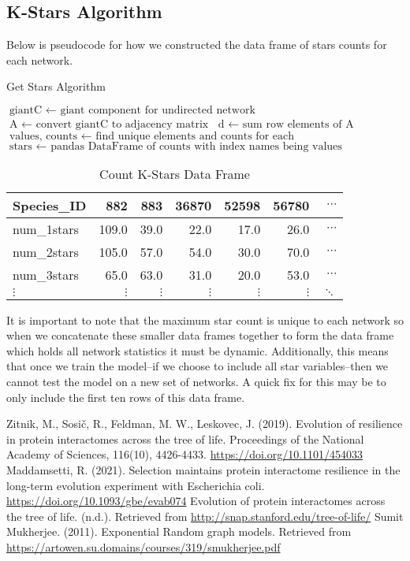 \documentclass[12pt]{article}
\begin{document}
\subsection{K-Stars Algorithm}
Below is pseudocode for how we constructed the data frame of stars counts for each network.
\begin{algorithm}
\caption{Get Stars Algorithm}\label{alg:cap}
\begin{algorithmic}
\State $\text{giantC } \gets \text{ giant component for undirected network}$
\State $\text{A } \gets \text{ convert giantC to adjacency matrix}$
\State $\text{d } \gets \text{ sum row elements of A}$
\State $\text{values, counts } \gets \text{ find unique elements and counts for each}$
\State $\text{stars } \gets \text{ pandas DataFrame of counts with index names being values}$
\end{algorithmic}
\end{algorithm}
\begin{table}[H]
\centering
\caption{Count K-Stars Data Frame}
\begin{tabular}{lrrrrrr}
\toprule
Species\_ID &  882   &  883   &  36870 &  52598 &  56780 & $\cdots$\\
\midrule
num\_1stars &  109.0 &   39.0 &   22.0 &   17.0 &   26.0 & $\cdots$\\
num\_2stars &  105.0 &   57.0 &   54.0 &   30.0 &   70.0 & $\cdots$\\
num\_3stars &   65.0 &   63.0 &   31.0 &   20.0 &   53.0 & $\cdots$\\
$\vdots$ &   $\vdots$ &   $\vdots$ &   $\vdots$ &    $\vdots$ &   $\vdots$ & $\ddots$\\
\bottomrule
\end{tabular}
\end{table}
It is important to note that the maximum star count is unique to each network so when we concatenate these smaller data frames together to form the data frame which holds all network statistics it must be dynamic. Additionally, this means that once we train the model--if we choose to include all star variables--then we cannot test the model on a new set of networks. A quick fix for this may be to only include the first ten rows of this data frame. \newpage
\begin{thebibliography}{1}
  Zitnik, M., Sosič, R., Feldman, M. W., Leskovec, J. (2019). Evolution of resilience in protein interactomes across the tree of life. Proceedings of the National Academy of Sciences, 116(10), 4426-4433. \url{https://doi.org/10.1101/454033}
 Maddamsetti, R. (2021). Selection maintains protein interactome resilience in the long-term evolution experiment with Escherichia coli. \url{https://doi.org/10.1093/gbe/evab074}
 Evolution of protein interactomes across the tree of life. (n.d.). Retrieved from \url{http://snap.stanford.edu/tree-of-life/}
 Sumit Mukherjee. (2011). Exponential Random graph models. Retrieved from \url{https://artowen.su.domains/courses/319/smukherjee.pdf}
  \end{thebibliography}

\end{document}
